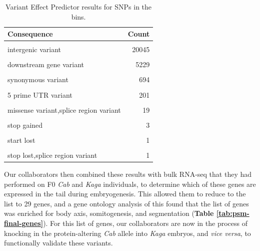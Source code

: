 \documentclass[
]{book}
\begin{document}
\begin{table}

\caption{\label{tab:int-consequence-tbl}Variant Effect Predictor results for SNPs in the bins.}
\centering
\begin{tabular}[t]{lr}
\toprule
Consequence & Count\\
\midrule
\cellcolor{gray!6}{intron variant} & \cellcolor{gray!6}{47211}\\
intergenic variant & 20045\\
\cellcolor{gray!6}{upstream gene variant} & \cellcolor{gray!6}{7304}\\
downstream gene variant & 5229\\
\cellcolor{gray!6}{3 prime UTR variant} & \cellcolor{gray!6}{1082}\\
\addlinespace
synonymous variant & 694\\
\cellcolor{gray!6}{missense variant} & \cellcolor{gray!6}{383}\\
5 prime UTR variant & 201\\
\cellcolor{gray!6}{splice region variant,intron variant} & \cellcolor{gray!6}{126}\\
missense variant,splice region variant & 19\\
\addlinespace
\cellcolor{gray!6}{splice region variant,synonymous variant} & \cellcolor{gray!6}{17}\\
stop gained & 3\\
\cellcolor{gray!6}{splice donor variant} & \cellcolor{gray!6}{1}\\
start lost & 1\\
\cellcolor{gray!6}{stop lost} & \cellcolor{gray!6}{1}\\
\addlinespace
stop lost,splice region variant & 1\\
\bottomrule
\end{tabular}
\end{table}

Our collaborators then combined these results with bulk RNA-seq that they had performed on F0 \emph{Cab} and \emph{Kaga} individuals, to determine which of these genes are expressed in the tail during embryogenesis. This allowed them to reduce to the list to 29 genes, and a gene ontology analysis of this found that the list of genes was enriched for body axis, somitogenesis, and segmentation (\textbf{Table \ref{tab:psm-final-genes}}). For this list of genes, our collaborators are now in the process of knocking in the protein-altering \emph{Cab} allele into \emph{Kaga} embryos, and \emph{vice versa}, to functionally validate these variants.
\end{document}
